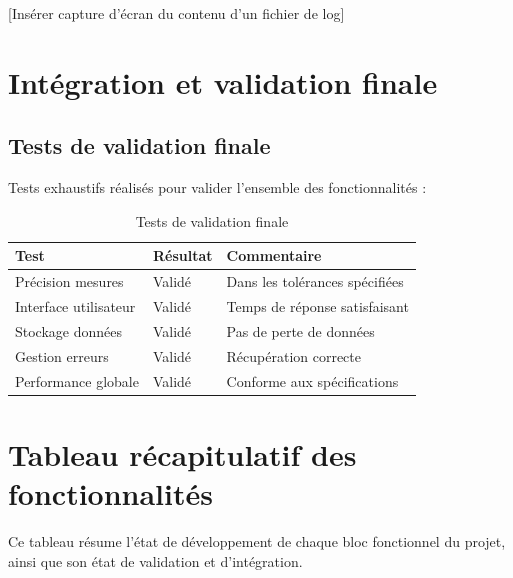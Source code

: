 \documentclass[12pt]{article}
\begin{document}
[Insérer capture d'écran du contenu d'un fichier de log]


\section{Intégration et validation finale}
\subsection{Tests de validation finale}
Tests exhaustifs réalisés pour valider l'ensemble des fonctionnalités :

\begin{table}[H]
\centering
\caption{Tests de validation finale}
\begin{tabular}{|l|l|l|}
\hline
\textbf{Test} & \textbf{Résultat} & \textbf{Commentaire} \\
\hline
Précision mesures & Validé & Dans les tolérances spécifiées \\
\hline
Interface utilisateur & Validé & Temps de réponse satisfaisant \\
\hline
Stockage données & Validé & Pas de perte de données \\
\hline
Gestion erreurs & Validé & Récupération correcte \\
\hline
Performance globale & Validé & Conforme aux spécifications \\
\hline
\end{tabular}
\end{table}

\section{Tableau récapitulatif des fonctionnalités}

Ce tableau résume l'état de développement de chaque bloc fonctionnel du projet, ainsi que son état de validation et d'intégration.
\end{document}
